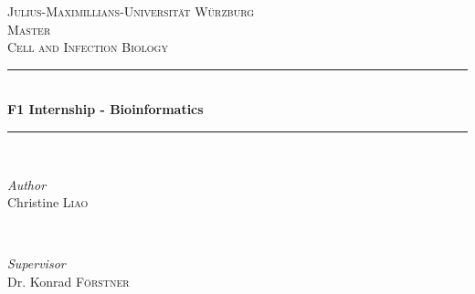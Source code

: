 \documentclass{article}
\begin{document}

\begin{titlepage} %
	\newcommand{\HRule}{\rule{\linewidth}{0.5mm}} %
	
	\center %
	
	
	\textsc{\LARGE Julius-Maximillians-Universit\"at W\"urzburg}\\[1.5cm] %
	
	\textsc{\Large Master}\\[0.5cm] %
	
	\textsc{\large Cell and Infection Biology}\\[0.5cm] %
	
	
	\HRule\\[0.4cm]
	
	{\huge\bfseries F1 Internship - Bioinformatics}\\[0.4cm] %
	
	\HRule\\[1.5cm]
	
	
	\begin{minipage}{0.4\textwidth}
		\begin{flushleft}
			\large
			\textit{Author}\\
			Christine \textsc{Liao} %
		\end{flushleft}
	\end{minipage}
	~
	\begin{minipage}{0.4\textwidth}
		\begin{flushright}
			\large
			\textit{Supervisor}\\
			Dr. Konrad  \textsc{F\"orstner} %
		\end{flushright}
	\end{minipage}
	

\end{titlepage}
\end{document}
